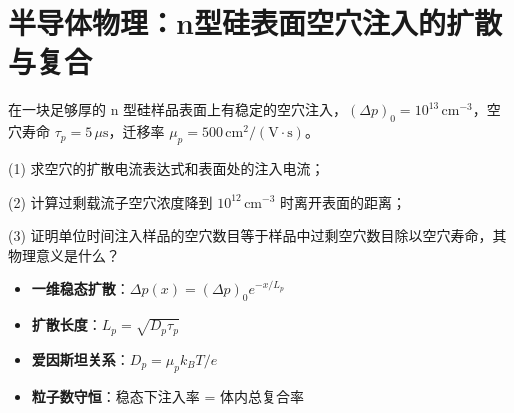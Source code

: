 \section{半导体物理：n型硅表面空穴注入的扩散与复合}
\label{sec:surface-injection-diffusion}

\begin{modelbox}[题目：n型硅表面空穴注入的稳态扩散]
在一块足够厚的 n 型硅样品表面上有稳定的空穴注入，$(\Delta p)_0=10^{13}\,\text{cm}^{-3}$，空穴寿命 $\tau_p=5\,\mu\text{s}$，迁移率 $\mu_p=500\,\text{cm}^2/(\text{V}\cdot\text{s})$。

(1) 求空穴的扩散电流表达式和表面处的注入电流；

(2) 计算过剩载流子空穴浓度降到 $10^{12}\,\text{cm}^{-3}$ 时离开表面的距离；

(3) 证明单位时间注入样品的空穴数目等于样品中过剩空穴数目除以空穴寿命，其物理意义是什么？
\end{modelbox}

\begin{tipbox}[考点快速分析]
\begin{itemize}
    \item \textbf{一维稳态扩散}：$\Delta p(x)=(\Delta p)_0e^{-x/L_p}$
    \item \textbf{扩散长度}：$L_p=\sqrt{D_p\tau_p}$
    \item \textbf{爱因斯坦关系}：$D_p=\mu_pk_BT/e$
    \item \textbf{粒子数守恒}：稳态下注入率 = 体内总复合率
\end{itemize}
\end{tipbox}

